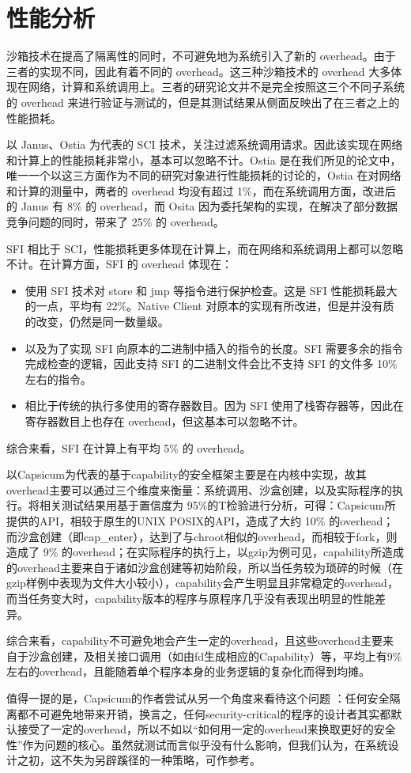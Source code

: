 \section{性能分析}
\label{ss: analysis}

沙箱技术在提高了隔离性的同时，不可避免地为系统引入了新的 overhead。由于三者的实现不同，因此有着不同的 overhead。这三种沙箱技术的 overhead 大多体现在网络，计算和系统调用上。三者的研究论文并不是完全按照这三个不同子系统的 overhead 来进行验证与测试的，但是其测试结果从侧面反映出了在三者之上的性能损耗。

以 Janus、Ostia 为代表的 SCI 技术，关注过滤系统调用请求。因此该实现在网络和计算上的性能损耗非常小，基本可以忽略不计。Ostia 是在我们所见的论文中，唯一一个以这三方面作为不同的研究对象进行性能损耗的讨论的，Ostia 在对网络和计算的测量中，两者的 overhead 均没有超过 1\%，而在系统调用方面，改进后的 Janus \parencite{wagner1999janus} 有 8\% 的 overhead，而 Osita 因为委托架构的实现，在解决了部分数据竞争问题的同时，带来了 25\% 的 overhead。

SFI 相比于 SCI，性能损耗更多体现在计算上，而在网络和系统调用上都可以忽略不计。在计算方面，SFI 的 overhead 体现在：

\begin{itemize}
\item
使用 SFI 技术对 store 和 jmp 等指令进行保护检查。这是 SFI 性能损耗最大的一点，平均有 22\%。Native Client 对原本的实现有所改进，但是并没有质的改变，仍然是同一数量级。
\item
以及为了实现 SFI 向原本的二进制中插入的指令的长度。SFI 需要多余的指令完成检查的逻辑，因此支持 SFI 的二进制文件会比不支持 SFI 的文件多 10\% 左右的指令。
\item
相比于传统的执行多使用的寄存器数目。因为 SFI 使用了栈寄存器等，因此在寄存器数目上也存在 overhead，但这基本可以忽略不计。
\end{itemize}

综合来看，SFI 在计算上有平均 5\% 的 overhead。

以Capsicum为代表的基于capability的安全框架主要是在内核中实现，故其overhead主要可以通过三个维度来衡量：系统调用、沙盒创建，以及实际程序的执行。将相关测试结果用基于置信度为 95\%的T检验进行分析，可得：Capsicum所提供的API，相较于原生的UNIX POSIX的API，造成了大约 10\% 的overhead；而沙盒创建（即cap\_enter），达到了与chroot相似的overhead，而相较于fork，则造成了 9\% 的overhead；在实际程序的执行上，以gzip为例可见，capability所造成的overhead主要来自于诸如沙盒创建等初始阶段，所以当任务较为琐碎的时候（在gzip样例中表现为文件大小较小），capability会产生明显且非常稳定的overhead，而当任务变大时，capability版本的程序与原程序几乎没有表现出明显的性能差异。

综合来看，capability不可避免地会产生一定的overhead，且这些overhead主要来自于沙盒创建，及相关接口调用（如由fd生成相应的Capability）等，平均上有9\%左右的overhead，且能随着单个程序本身的业务逻辑的复杂化而得到均摊。

值得一提的是，Capsicum的作者尝试从另一个角度来看待这个问题 \parencite{capsicum}：任何安全隔离都不可避免地带来开销，换言之，任何security-critical的程序的设计者其实都默认接受了一定的overhead，所以不如以“如何用一定的overhead来换取更好的安全性”作为问题的核心。虽然就测试而言似乎没有什么影响，但我们认为，在系统设计之初，这不失为另辟蹊径的一种策略，可作参考。
